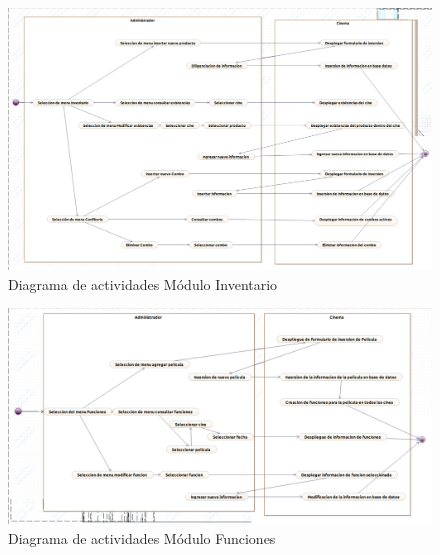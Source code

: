 \begin{figure}[h!]
	\centering
	\includegraphics[scale=0.4]{diseno/actividades/img/inventario}
	\caption{Diagrama de actividades Módulo Inventario}
\end{figure}

\begin{figure}[h!]
	\centering
	\includegraphics[scale=0.4]{diseno/actividades/img/funciones}
	\caption{Diagrama de actividades Módulo Funciones}
\end{figure}
